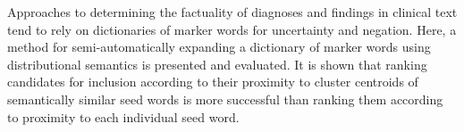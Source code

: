 Approaches to determining the factuality of diagnoses and findings in clinical text tend to rely on dictionaries of marker words for uncertainty and negation. Here, a method for semi-automatically expanding a dictionary of marker words using distributional semantics is presented and evaluated. It is shown that ranking candidates for inclusion according to their proximity to cluster centroids of semantically similar seed words is more successful than ranking them according to proximity to each individual seed word.

